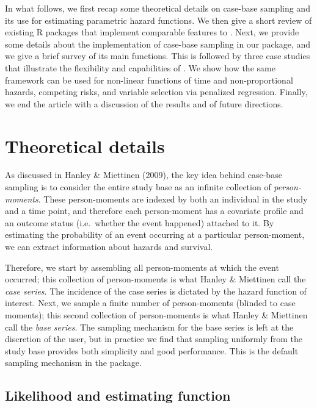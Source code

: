 In what follows, we first recap some theoretical details on case-base sampling
and its use for estimating parametric hazard functions. We then give a short
review of existing R packages that implement comparable features to .
Next, we provide some details about the implementation of case-base sampling in
our package, and we give a brief survey of its main functions. This is followed
by three case studies that illustrate the flexibility and capabilities of
. We show how the same framework can be used for non-linear
functions of time and non-proportional hazards, competing risks, and variable
selection via penalized regression. Finally, we end the article with a
discussion of the results and of future directions.

\hypertarget{theory}{%
\section{Theoretical details}\label{theory}}

As discussed in Hanley \& Miettinen (2009), the key idea behind case-base sampling is to consider the entire study base as an infinite collection of \emph{person-moments}. These person-moments are indexed by both an individual in the study and a time point, and therefore each person-moment has a covariate profile and an outcome status (i.e.~whether the event happened) attached to it. By estimating the probability of an event occurring at a particular person-moment, we can extract information about hazards and survival.

Therefore, we start by assembling all person-moments at which the event occurred; this collection of person-moments is what Hanley \& Miettinen call the \emph{case series}. The incidence of the case series is dictated by the hazard function of interest. Next, we sample a finite number of person-moments (blinded to case moments); this second collection of person-moments is what Hanley \& Miettinen call the \emph{base series}. The sampling mechanism for the base series is left at the discretion of the user, but in practice we find that sampling uniformly from the study base provides both simplicity and good performance. This is the default sampling mechanism in the package.

\hypertarget{likelihood-and-estimating-function}{%
\subsection{Likelihood and estimating function}\label{likelihood-and-estimating-function}}

